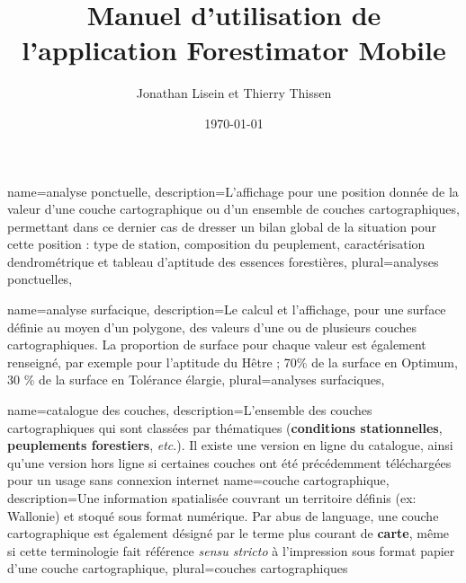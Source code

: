 \documentclass[12pt,a4paper]{report}
\title{Manuel d'utilisation de l'application Forestimator Mobile}
\author{Jonathan Lisein et Thierry Thissen}
\date{\today}
\begin{document}
{
	name={analyse ponctuelle},
	description={L'affichage pour une position donnée de la valeur d'une couche cartographique ou d'un ensemble de couches cartographiques, permettant dans ce dernier cas de dresser un bilan global de la situation pour cette position : type de station, composition du peuplement, caractérisation dendrométrique et tableau d'aptitude des essences forestières},
	plural={analyses ponctuelles},
}

{
	name={analyse surfacique},
	description={Le calcul et l'affichage, pour une surface définie au moyen d'un polygone, des valeurs d'une ou de plusieurs couches cartographiques. La proportion de surface pour chaque valeur est également renseigné, par exemple pour l'aptitude du Hêtre ; 70\% de la surface en Optimum, 30 \% de la surface en Tolérance élargie},
	plural={analyses surfaciques},
}


{
	name={catalogue des couches},
	description={L'ensemble des couches cartographiques qui sont classées par thématiques (\textbf{conditions stationnelles}, \textbf{peuplements forestiers}, \textit{etc}.). Il existe une version en ligne du catalogue, ainsi qu'une version hors ligne si certaines couches ont été précédemment téléchargées pour un usage sans connexion internet}
}
{
	name={couche cartographique},
	description={Une information spatialisée couvrant un territoire définis (ex: Wallonie) et stoqué sous format numérique. Par abus de language, une couche cartographique est également désigné par le terme plus courant de \textbf{carte}, même si cette terminologie fait référence \textit{sensu stricto} à l'impression sous format papier d'une couche cartographique},
	plural={couches cartographiques}
}
\end{document}
